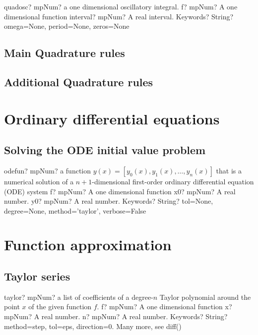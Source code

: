 \documentclass[12pt,a4paper,openany]{book}
\begin{document}
\begin{mpFunctionsExtract}
\mpFunctionThree
{quadosc? mpNum? a one dimensional oscillatory integral.}
{f? mpNum? A one dimensional function}
{interval? mpNum? A real interval.}
{Keywords? String? omega=None, period=None, zeros=None}
\end{mpFunctionsExtract}

\section{Main Quadrature rules}

\section{Additional Quadrature rules}

\chapter{Ordinary differential equations}

\section{Solving the ODE initial value problem}

\begin{mpFunctionsExtract}
\mpFunctionFour
{odefun? mpNum? a function $y(x) = [y_0(x),y_1(x),\ldots,y_n(x)]$ that is a numerical solution of a $n+1$-dimensional first-order ordinary differential equation (ODE) system}
{f? mpNum? A one dimensional function}
{x0? mpNum? A real number.}
{y0? mpNum? A real number.}
{Keywords? String?  tol=None, degree=None, method='taylor', verbose=False}
\end{mpFunctionsExtract}

\chapter{Function approximation}

\section{Taylor series}

\begin{mpFunctionsExtract}
\mpFunctionFour
{taylor? mpNum? a list of coefficients of a degree-$n$ Taylor polynomial around the point $x$ of the given function $f$.}
{f? mpNum? A one dimensional function}
{x? mpNum? A real number.}
{n? mpNum? A real number.}
{Keywords? String?  method=step, tol=eps, direction=0. Many more, see diff()}
\end{mpFunctionsExtract}
\end{document}
